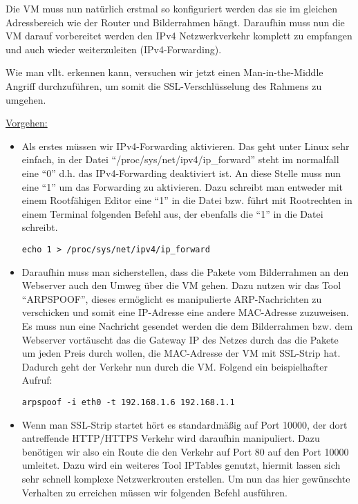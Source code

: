 \begin{flushleft}
    Die VM muss nun natürlich erstmal so konfiguriert werden das sie im gleichen Adressbereich wie der Router und Bilderrahmen hängt. Daraufhin muss nun die VM darauf vorbereitet werden den IPv4 Netzwerkverkehr komplett zu empfangen und auch wieder weiterzuleiten (IPv4-Forwarding).\par Wie man vllt. erkennen kann, versuchen wir jetzt einen Man-in-the-Middle Angriff durchzuführen, um somit die SSL-Verschlüsselung des Rahmens zu umgehen.\newpage
    
    \underline{Vorgehen:}\\
    \begin{itemize}
    \item Als erstes müssen wir IPv4-Forwarding aktivieren. Das geht unter Linux sehr einfach, in der Datei ``/proc/sys/net/ipv4/ip\_forward'' steht im normalfall eine ``0'' d.h. das IPv4-Forwarding deaktiviert ist. An diese Stelle muss nun eine ``1'' um das Forwarding zu aktivieren. Dazu schreibt man entweder mit einem Rootfähigen Editor eine ``1'' in die Datei bzw. führt mit Rootrechten in einem Terminal folgenden Befehl aus, der ebenfalls die ``1'' in die Datei schreibt.\\\vspace{.3cm}
    \begin{center}
      \verb+echo 1 > /proc/sys/net/ipv4/ip_forward+
    \end{center}    
    \item Daraufhin muss man sicherstellen, dass die Pakete vom Bilderrahmen an den Webserver auch den Umweg über die VM gehen. Dazu nutzen wir das Tool ``ARPSPOOF'', dieses ermöglicht es manipulierte ARP-Nachrichten zu verschicken und somit eine IP-Adresse eine andere MAC-Adresse zuzuweisen. Es muss nun eine Nachricht gesendet werden die dem Bilderrahmen bzw. dem Webserver vortäuscht das die Gateway IP des Netzes durch das die Pakete um jeden Preis durch wollen, die MAC-Adresse der VM mit SSL-Strip hat. Dadurch geht der Verkehr nun durch die VM. Folgend ein beispielhafter Aufruf:
    \begin{center}
      \verb+arpspoof -i eth0 -t 192.168.1.6 192.168.1.1+
    \end{center}
    \item Wenn man SSL-Strip startet hört es standardmäßig auf Port 10000, der dort antreffende HTTP/HTTPS Verkehr wird daraufhin manipuliert. Dazu benötigen wir also ein Route die den Verkehr auf Port 80 auf den Port 10000 umleitet. Dazu wird ein weiteres Tool IPTables genutzt, hiermit lassen sich sehr schnell komplexe Netzwerkrouten erstellen. Um nun das hier gewünschte Verhalten zu erreichen müssen wir folgenden Befehl ausführen.

\end{itemize}
\end{flushleft}
